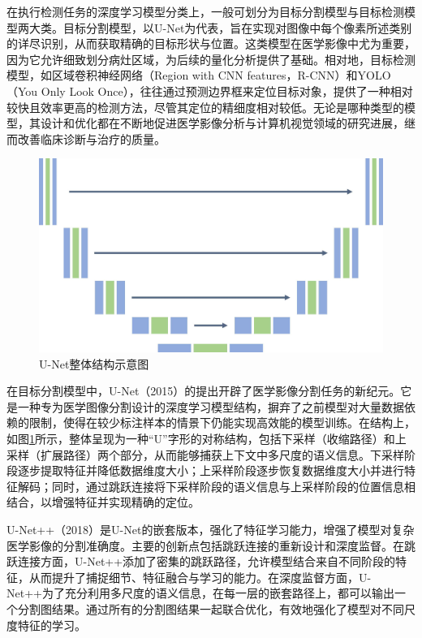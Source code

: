 在执行检测任务的深度学习模型分类上，一般可划分为目标分割模型与目标检测模型两大类。目标分割模型，以U-Net\cite{ronneberger2015u}为代表，旨在实现对图像中每个像素所述类别的详尽识别，从而获取精确的目标形状与位置。这类模型在医学影像中尤为重要，因为它允许细致划分病灶区域，为后续的量化分析提供了基础。相对地，目标检测模型，如区域卷积神经网络（Region with CNN features，R-CNN）\cite{girshick2014rich}和YOLO（You Only Look Once）\cite{redmon2016you}，往往通过预测边界框来定位目标对象，提供了一种相对较快且效率更高的检测方法，尽管其定位的精细度相对较低。无论是哪种类型的模型，其设计和优化都在不断地促进医学影像分析与计算机视觉领域的研究进展，继而改善临床诊断与治疗的质量。

\begin{figure}[htbp]
  \centering
  \includegraphics[width=\textwidth]{figures/chap02_unet.jpg}
  \caption{U-Net整体结构示意图}
  \label{fig:chap02_unet}
\end{figure}

在目标分割模型中，U-Net\cite{ronneberger2015u}（2015）的提出开辟了医学影像分割任务的新纪元。它是一种专为医学图像分割设计的深度学习模型结构，摒弃了之前模型对大量数据依赖的限制，使得在较少标注样本的情景下仍能实现高效能的模型训练。在结构上，如图\ref{fig:chap02_unet}所示，整体呈现为一种“U”字形的对称结构，包括下采样（收缩路径）和上采样（扩展路径）两个部分，从而能够捕获上下文中多尺度的语义信息。下采样阶段逐步提取特征并降低数据维度大小；上采样阶段逐步恢复数据维度大小并进行特征解码；同时，通过跳跃连接将下采样阶段的语义信息与上采样阶段的位置信息相结合，以增强特征并实现精确的定位。

U-Net++\cite{zhou2018unet++}（2018）是U-Net\cite{ronneberger2015u}的嵌套版本，强化了特征学习能力，增强了模型对复杂医学影像的分割准确度。主要的创新点包括跳跃连接的重新设计和深度监督。在跳跃连接方面，U-Net++添加了密集的跳跃路径，允许模型结合来自不同阶段的特征，从而提升了捕捉细节、特征融合与学习的能力。在深度监督方面，U-Net++为了充分利用多尺度的语义信息，在每一层的嵌套路径上，都可以输出一个分割图结果。通过所有的分割图结果一起联合优化，有效地强化了模型对不同尺度特征的学习。

